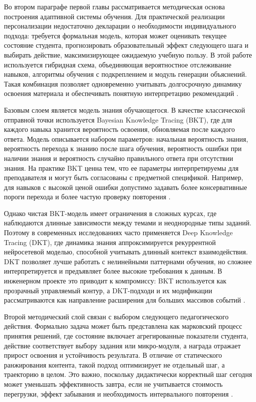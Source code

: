 Во втором параграфе первой главы рассматривается методическая основа построения
адаптивной системы обучения. Для практической реализации персонализации
недостаточно декларации о необходимости индивидуального подхода: требуется
формальная модель, которая может оценивать текущее состояние студента,
прогнозировать образовательный эффект следующего шага и выбирать действие,
максимизирующее ожидаемую учебную пользу. В этой работе используется гибридная
схема, объединяющая вероятностное отслеживание навыков, алгоритмы обучения с
подкреплением и модуль генерации объяснений. Такая комбинация позволяет
одновременно учитывать долгосрочную динамику освоения материала и обеспечивать
понятную интерпретацию рекомендаций
\autocite{corbett1994,piech2015,mon2023rl,sok2024llm}.

Базовым слоем является модель знания обучающегося. В качестве классической
отправной точки используется Bayesian Knowledge Tracing (BKT), где для каждого
навыка хранится вероятность освоения, обновляемая после каждого ответа. Модель
описывается набором параметров: начальная вероятность знания, вероятность
перехода к знанию после шага обучения, вероятность ошибки при наличии знания и
вероятность случайно правильного ответа при отсутствии знания. На практике BKT
ценна тем, что ее параметры интерпретируемы для преподавателя и могут быть
согласованы с предметной спецификой. Например, для навыков с высокой ценой
ошибки допустимо задавать более консервативные пороги перехода и более частую
проверку повторения \autocite{corbett1994}.

Однако чистая BKT-модель имеет ограничения в сложных курсах, где наблюдаются
длинные зависимости между темами и неоднородные типы заданий. Поэтому в
современных исследованиях часто применяется Deep Knowledge Tracing (DKT), где
динамика знания аппроксимируется рекуррентной нейросетевой моделью, способной
учитывать длинный контекст взаимодействия. DKT позволяет лучше работать с
нелинейными паттернами обучения, но сложнее интерпретируется и предъявляет
более высокие требования к данным. В инженерном проекте это приводит к
компромиссу: BKT используется как прозрачный управляемый контур, а DKT-подходи
и их модификации рассматриваются как направление расширения для больших
массивов событий \autocite{piech2015,chen2018}.

Второй методический слой связан с выбором следующего педагогического действия.
Формально задача может быть представлена как марковский процесс принятия
решений, где состояние включает агрегированные показатели студента, действие
соответствует выбору задания или микро-модуля, а награда отражает прирост
освоения и устойчивость результата. В отличие от статического ранжирования
контента, такой подход оптимизирует не отдельный шаг, а траекторию в целом. Это
важно, поскольку дидактически корректный шаг сегодня может уменьшать
эффективность завтра, если не учитывается стоимость перегрузки, эффект
забывания и необходимость интервального повторения
\autocite{mnih2015,subramanian2020}.


